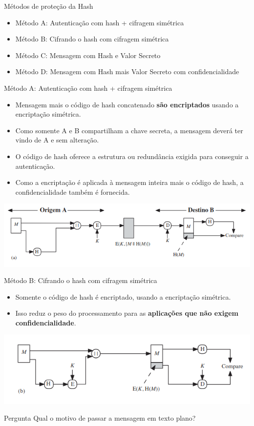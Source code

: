 \begin{frame}{Métodos de proteção da Hash}
    \begin{itemize}
        \item Método A: Autenticação com hash + cifragem simétrica
        \item Método B: Cifrando o hash com cifragem simétrica
        \item Método C: Mensagem com Hash e Valor Secreto
        \item Método D: Mensagem com Hash mais Valor Secreto com confidencialidade
    \end{itemize}

\end{frame}

\begin{frame}{Método A: Autenticação com hash + cifragem simétrica}
    \begin{itemize}
        \item Mensagem mais o código de hash concatenado \textbf{são encriptados} usando a encriptação simétrica.
        \item Como somente A e B compartilham a chave secreta, a mensagem deverá ter vindo de A e sem alteração.
        \item O código de hash oferece a estrutura ou redundância exigida para conseguir a autenticação.
        \item Como a encriptação é aplicada à mensagem inteira mais o código de hash, a confidencialidade também é fornecida.
    \end{itemize}

    \centering
    \includegraphics[width=0.7\linewidth]{Figuras/esquema1-hash.png}
\end{frame}

\begin{frame}{Método B: Cifrando o hash com cifragem simétrica}
    \begin{itemize}
        \item Somente o código de hash é encriptado, usando a encriptação simétrica.
        \item Isso reduz o peso do processamento para as \textbf{aplicações que não exigem confidencialidade}.

    \end{itemize}

    \centering
    \includegraphics[width=0.7\linewidth]{Figuras/esquema2-hash.png}
    \begin{block}{Pergunta}
        Qual o motivo de passar a mensagem em texto plano?
    \end{block}
\end{frame}

